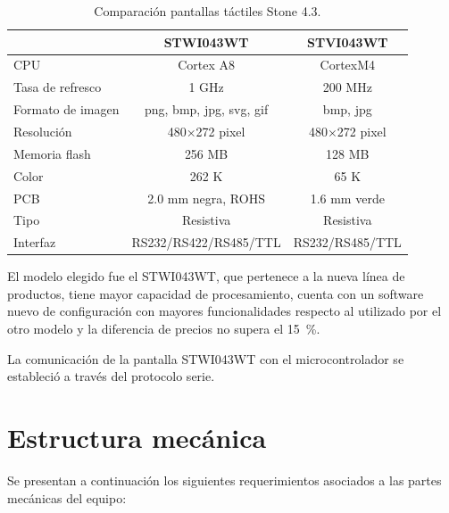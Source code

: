 \begin{table}[!ht]
	\centering
	\caption[Comparación Stone]{Comparación pantallas táctiles Stone 4.3.}
	\begin{tabular}{l c c }    
		\toprule
		\textbf{}     & \textbf{STWI043WT} & \textbf{STVI043WT} \\
		\midrule
		CPU 			& 	Cortex A8         		& 	CortexM4 			 	\\		
		Tasa de refresco    & 	1 GHz         			& 	200 MHz 				\\
		Formato de imagen  	& 	png, bmp, jpg, svg, gif     & 	bmp, jpg 				\\
		Resolución		& 	480×272 pixel	        & 	480×272 pixel 			\\
		Memoria flash 			& 	256 MB         			& 	128 MB 					\\
		Color  			& 	262 K	          		& 	65 K 					\\
		PCB 			& 	2.0 mm negra, ROHS       & 	1.6 mm verde 			\\
		Tipo		& 	Resistiva   			& 	Resistiva				\\
		Interfaz 		& 	RS232/RS422/RS485/TTL   & 	RS232/RS485/TTL			\\
		\bottomrule
		\hline
	\end{tabular}
	\label{tab:tabla_stone}
\end{table}


El modelo elegido fue el STWI043WT, que pertenece a la nueva línea de productos, tiene mayor capacidad de procesamiento, cuenta con un software nuevo de configuración con mayores funcionalidades respecto al utilizado por el otro modelo y la diferencia de precios no supera el \SI{15}{\percent}.  

La comunicación de la pantalla STWI043WT con el microcontrolador se estableció a través del protocolo serie.



\section{Estructura mecánica}
\label{sec:estructura_mecanica}

Se presentan a continuación los siguientes requerimientos asociados a las partes mecánicas del equipo: 

